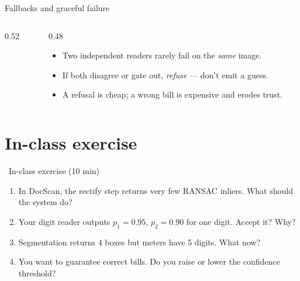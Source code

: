 \documentclass[10pt,aspectratio=169]{beamer}
\begin{document}
\begin{frame}{Fallbacks and graceful failure}
  \begin{columns}[T]
    \begin{column}{0.52\textwidth}
    \end{column}
    \begin{column}{0.48\textwidth}
      \begin{itemize}
        \item Two independent readers rarely fail on the \emph{same} image.
        \item If both disagree or gate out, \emph{refuse} — don't emit a guess.
        \item A refusal is cheap; a wrong bill is expensive and erodes trust.
      \end{itemize}
    \end{column}
  \end{columns}
\end{frame}

\section{In-class exercise}

\begin{frame}{\faPen~In-class exercise (10 min)}
  \begin{infobox}
  \end{infobox}
  \begin{enumerate}
    \item In DocScan, the rectify step returns very few RANSAC inliers. What should the system do?
    \item Your digit reader outputs $p_1=0.95$, $p_2=0.90$ for one digit. Accept it? Why?
    \item Segmentation returns 4 boxes but meters have 5 digits. What now?
    \item You want to guarantee correct bills. Do you raise or lower the confidence threshold?
  \end{enumerate}
\end{frame}
\end{document}
